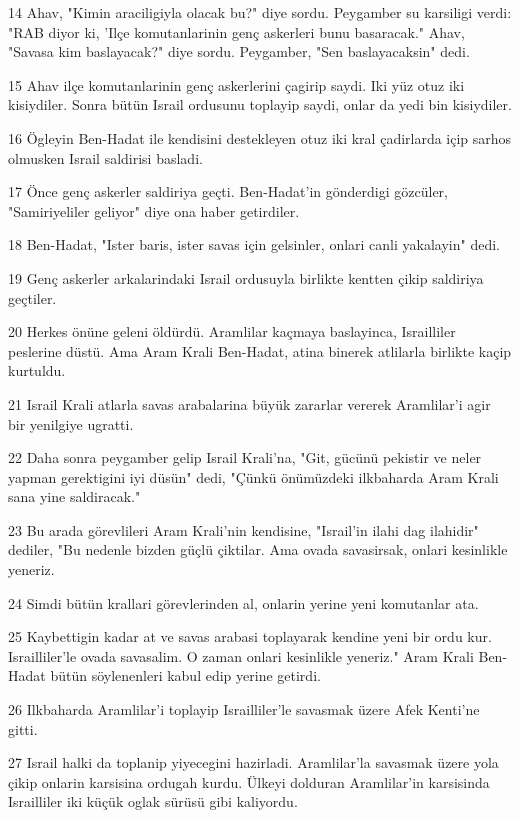\par 14 Ahav, "Kimin araciligiyla olacak bu?" diye sordu. Peygamber su karsiligi verdi: "RAB diyor ki, 'Ilçe komutanlarinin genç askerleri bunu basaracak." Ahav, "Savasa kim baslayacak?" diye sordu. Peygamber, "Sen baslayacaksin" dedi.
\par 15 Ahav ilçe komutanlarinin genç askerlerini çagirip saydi. Iki yüz otuz iki kisiydiler. Sonra bütün Israil ordusunu toplayip saydi, onlar da yedi bin kisiydiler.
\par 16 Ögleyin Ben-Hadat ile kendisini destekleyen otuz iki kral çadirlarda içip sarhos olmusken Israil saldirisi basladi.
\par 17 Önce genç askerler saldiriya geçti. Ben-Hadat'in gönderdigi gözcüler, "Samiriyeliler geliyor" diye ona haber getirdiler.
\par 18 Ben-Hadat, "Ister baris, ister savas için gelsinler, onlari canli yakalayin" dedi.
\par 19 Genç askerler arkalarindaki Israil ordusuyla birlikte kentten çikip saldiriya geçtiler.
\par 20 Herkes önüne geleni öldürdü. Aramlilar kaçmaya baslayinca, Israilliler peslerine düstü. Ama Aram Krali Ben-Hadat, atina binerek atlilarla birlikte kaçip kurtuldu.
\par 21 Israil Krali atlarla savas arabalarina büyük zararlar vererek Aramlilar'i agir bir yenilgiye ugratti.
\par 22 Daha sonra peygamber gelip Israil Krali'na, "Git, gücünü pekistir ve neler yapman gerektigini iyi düsün" dedi, "Çünkü önümüzdeki ilkbaharda Aram Krali sana yine saldiracak."
\par 23 Bu arada görevlileri Aram Krali'nin kendisine, "Israil'in ilahi dag ilahidir" dediler, "Bu nedenle bizden güçlü çiktilar. Ama ovada savasirsak, onlari kesinlikle yeneriz.
\par 24 Simdi bütün krallari görevlerinden al, onlarin yerine yeni komutanlar ata.
\par 25 Kaybettigin kadar at ve savas arabasi toplayarak kendine yeni bir ordu kur. Israilliler'le ovada savasalim. O zaman onlari kesinlikle yeneriz." Aram Krali Ben-Hadat bütün söylenenleri kabul edip yerine getirdi.
\par 26 Ilkbaharda Aramlilar'i toplayip Israilliler'le savasmak üzere Afek Kenti'ne gitti.
\par 27 Israil halki da toplanip yiyecegini hazirladi. Aramlilar'la savasmak üzere yola çikip onlarin karsisina ordugah kurdu. Ülkeyi dolduran Aramlilar'in karsisinda Israilliler iki küçük oglak sürüsü gibi kaliyordu.
